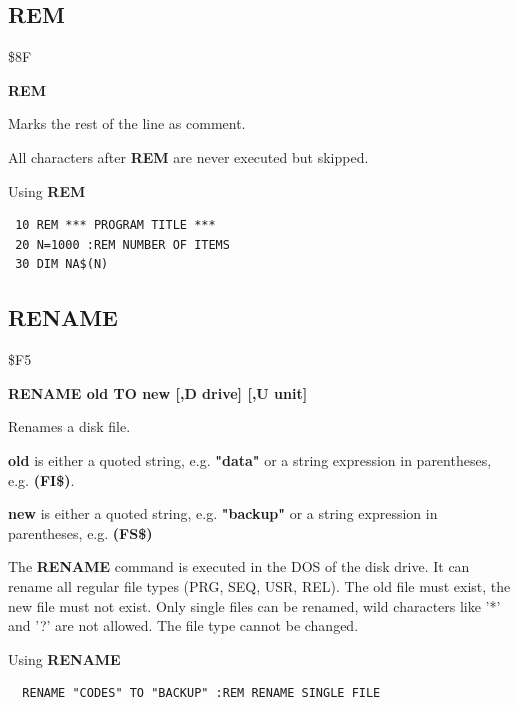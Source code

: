 
\newpage
\subsection{REM}
\begin{description}[leftmargin=2cm,style=nextline]
\item [Token:] \$8F
\item [Format:] {\bf REM}
\item [Usage:]  Marks the rest of the line as comment.

                All characters after {\bf REM} are never executed
                but skipped.

\item [Example:] Using {\bf REM}

\begin{tcolorbox}[colback=black,coltext=white]
\verbatimfont{\codefont}
\begin{verbatim}
 10 REM *** PROGRAM TITLE ***
 20 N=1000 :REM NUMBER OF ITEMS
 30 DIM NA$(N)
\end{verbatim}
\end{tcolorbox}
\end{description}


\newpage
\subsection{RENAME}
\begin{description}[leftmargin=2cm,style=nextline]
\item [Token:] \$F5
\item [Format:] {\bf RENAME old TO new [,D drive] [,U unit] }
\item [Usage:] Renames a disk file.

   {\bf old} is either a quoted string, e.g. {\bf "data"} or
   a string expression in parentheses, e.g. {\bf (FI\$)}.

   {\bf new} is either a quoted string, e.g. {\bf "backup"} or
   a string expression in parentheses, e.g. {\bf (FS\$)}

   \drivedefinition

   \unitdefinition

\item [Remarks:]
   The {\bf RENAME} command is executed in the DOS of the disk drive.
   It can rename all regular file types (PRG, SEQ, USR, REL).
   The old file must exist, the new file must not exist.
   Only single files can be renamed, wild characters like
   '*' and '?' are not allowed. The file type cannot be changed.

\item [Example:] Using {\bf RENAME}
\begin{tcolorbox}[colback=black,coltext=white]
\verbatimfont{\codefont}
\begin{verbatim}
  RENAME "CODES" TO "BACKUP" :REM RENAME SINGLE FILE
\end{verbatim}
\end{tcolorbox}
\end{description}

